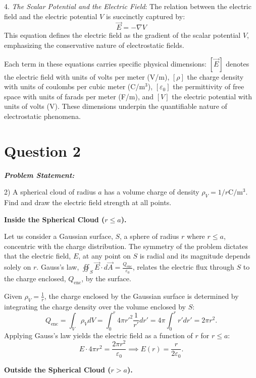 \documentclass[12pt]{article}
\newenvironment{q}
{
    \begin{qframe}
    \noindent\textit{\textbf{Problem Statement:}}
    \par\smallskip
}
{
    \end{qframe}
}
\begin{document}
4. \textit{The Scalar Potential and the Electric Field}: The relation between the electric field and the electric potential \(V\) is succinctly captured by:
   \[
   \vec{E} = -\nabla V
   \]
   This equation defines the electric field as the gradient of the scalar potential \(V\), emphasizing the conservative nature of electrostatic fields.

Each term in these equations carries specific physical dimensions: \([\vec{E}]\) denotes the electric field with units of volts per meter (V/m), \([\rho]\) the charge density with units of coulombs per cubic meter (C/m\(^3\)), \([\varepsilon_0]\) the permittivity of free space with units of farads per meter (F/m), and \([V]\) the electric potential with units of volts (V). These dimensions underpin the quantifiable nature of electrostatic phenomena.

\newpage
\section*{Question 2}
\begin{q}
2) A spherical cloud of radius \(a\) has a volume charge of density \(\rho_V=1 / r \mathrm{C} / \mathrm{m}^3\). Find and draw the electric field strength at all points.
\end{q}


\textbf{Inside the Spherical Cloud (\(r \leq a\)).}


Let us consider a Gaussian surface, \(S\), a sphere of radius \(r\) where \(r \leq a\), concentric with the charge distribution. The symmetry of the problem dictates that the electric field, \(E\), at any point on \(S\) is radial and its magnitude depends solely on \(r\). Gauss's law, \(\oiint_S \vec{E} \cdot d\vec{A} = \frac{Q_{\text{enc}}}{\varepsilon_0}\), relates the electric flux through \(S\) to the charge enclosed, \(Q_{\text{enc}}\), by the surface.

Given \(\rho_V = \frac{1}{r}\), the charge enclosed by the Gaussian surface is determined by integrating the charge density over the volume enclosed by \(S\):
\[
Q_{\text{enc}} = \int_V \rho_V dV = \int_0^r 4\pi r'^2 \frac{1}{r'} dr' = 4\pi \int_0^r r' dr' = 2\pi r^2.
\]
Applying Gauss's law yields the electric field as a function of \(r\) for \(r \leq a\):
\[
E \cdot 4\pi r^2 = \frac{2\pi r^2}{\varepsilon_0} \implies E(r) = \frac{r}{2\varepsilon_0}.
\]

\textbf{Outside the Spherical Cloud (\(r > a\)).}
\end{document}
